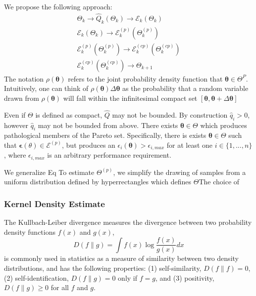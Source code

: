 We propose the following approach:
\begin{subequations}
\begin{gather}
      \Theta_k \rightarrow \hat{Q}_k(\Theta_k) \rightarrow \mathcal{E}_k(\Theta_k) \\
      \mathcal{E}_k(\Theta_k) \rightarrow \mathcal{E}_k^{(p)}(\Theta_k^{(p)}) \\
      \mathcal{E}_k^{(p)}(\Theta_k^{(p)}) \rightarrow \mathcal{E}_k^{(cp)}(\Theta_k^{(cp)}) \\
      \mathcal{E}_k^{(cp)}(\Theta_k^{(cp)}) \rightarrow \Theta_{k+1}
\end{gather}
\end{subequations}
The notation $\rho(\bm{\theta})$ refers to the joint probability density function that $\bm{\theta} \in \Theta^{P}$.
Intuitively, one can think of
$\rho(\bm{\theta})\Delta\bm{\theta}$
as the probability that a random variable drawn from $\rho(\bm{\theta})$ will fall within the infinitesimal compact set $[\bm{\theta},\bm{\theta}+\Delta\bm{\theta}]$

Even if $\Theta$ is defined as compact, $\hat{Q}$ may not be bounded.  By construction $\hat{q}_i > 0 $, however $\hat{q}_i$ may not be bounded from above.  There exists $\bm{\theta} \in \Theta$ which produces pathological members of the Pareto set.  Specifically, there is exists $\bm{\theta} \in \Theta$ such that $\bm{\epsilon}(\theta) \in \mathcal{E}^(p)$, but produces an $\epsilon_i(\bm{\theta}) > \epsilon_{i,max}$ for at least one $i\in\{1,...,n\}$, where $\epsilon_{i,max}$ is an arbitrary performance requirement.

We generalize Eq
To estimate $\Theta^{(p)}$, we simplify the drawing of samples from a uniform distribution defined by hyperrectangles which defines $\Theta$The choice of
\subsubsection{Kernel Density Estimate}

The Kullbach-Leiber divergence\cite{kullback1997} measures the divergence between two probability density functions $f(x)$ and $g(x)$,
\begin{equation}\label{eq:kld}
   D(f \parallel g) = \int f(x) \log \frac{f(x)}
                                          {g(x)} dx
\end{equation}
is commonly used in statistics as a measure of similarity between two density distributions, and has the following properties: (1) self-similarity, $D(f \parallel f) = 0$, (2) self-identification, $D(f \parallel g) = 0$ only if $f=g$, and (3) positivity, $D(f \parallel g) \geq 0$ for all $f$ and $g$.

